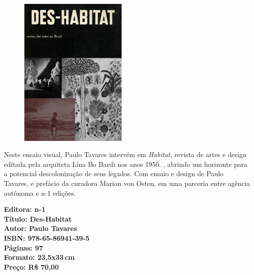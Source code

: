 \pagestyle{n-1}
\label{n-1}

\pagebreak


\begin{center}
\hspace*{.5cm}\includegraphics[width=74mm]{./CAPAS/habitat.jpg}
\end{center}

\hspace*{-7cm}\hrulefill\hspace*{-7cm}

\medskip

\noindent{}Neste ensaio visual, Paulo Tavares intervém em \textit{Habitat}, revista de artes e design editada pela arquiteta Lina Bo Bardi nos anos 1950. , abrindo um horizonte para a potencial descolonização de seus legados. Com ensaio e design de Paulo Tavares, e prefácio da curadora Marion von Osten, em uma parceria entre agência autônoma e n-1 edições.

\vfill

\hspace*{-.4cm}\begin{minipage}[c]{1\linewidth}
\small\textbf{
\hspace*{-.1cm}Editora: n-1\\
Título: Des-Habitat\\
Autor: Paulo Tavares\\ 
ISBN: 978-65-86941-39-5\\
Páginas: 97\\
Formato: 23,5x33\,cm\\
Preço: R\$ 70,00\\
}
\end{minipage}

